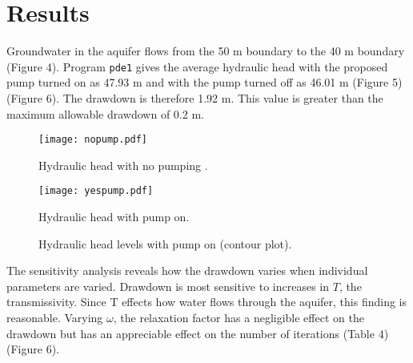 \documentclass[titlepage,11pt]{article}
\begin{document}
\section{Results}

Groundwater in the aquifer flows from the 50 m boundary to the 40 m
boundary (Figure 4).  Program \verb"pde1" gives the average
hydraulic head with the proposed pump turned on as 47.93 m and with
the pump turned off as 46.01 m (Figure 5) (Figure 6). The drawdown
is therefore 1.92 m. This value is greater than the maximum
allowable drawdown of 0.2 m.

\begin{figure}[h]
  \begin{minipage}{0.5\linewidth}
    \centering
    \texttt{[image: nopump.pdf]}
    \caption{Hydraulic head with no pumping .}
  \end{minipage}
  \begin{minipage}{0.5\linewidth}
    \centering
    \texttt{[image: yespump.pdf]}
    \caption{Hydraulic head with pump on.}
  \end{minipage}
\end{figure}

\begin{figure}[!h]
  \begin{center}
     \caption{Hydraulic head levels with pump on (contour plot).}
  \end{center}
\end{figure}

The sensitivity analysis reveals how the drawdown varies when
individual parameters are varied. Drawdown is most sensitive to
increases in $T$, the transmissivity.  Since T effects how water
flows through the aquifer, this finding is reasonable.  Varying
$\omega$, the relaxation factor has a negligible effect on the
drawdown but has an appreciable effect on the number of iterations
(Table 4) (Figure 6).
\end{document}

